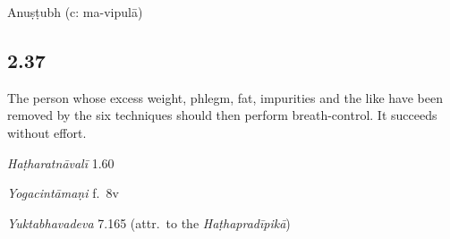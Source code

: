 \begin{ekdosis}
\begin{metre}[hp02_036]
Anuṣṭubh (c: ma-vipulā)
\end{metre}

\subsection*{2.37}
\begin{translation}[hp02_037]
The person whose excess weight, phlegm, fat, impurities and the like have been removed by the six techniques should then perform breath-control. It succeeds without effort.
\end{translation}


\begin{testimonia}[hp02_037]
\emph{Haṭharatnāvalī} 1.60

\begin{versinnote}
\end{versinnote} 

\emph{Yogacintāmaṇi} f.~8v

\begin{versinnote}
\end{versinnote}

\emph{Yuktabhavadeva} 7.165 (attr.~to the \emph{Haṭhapradīpikā})

\begin{versinnote}
\end{versinnote}
\end{testimonia}



\end{ekdosis}

